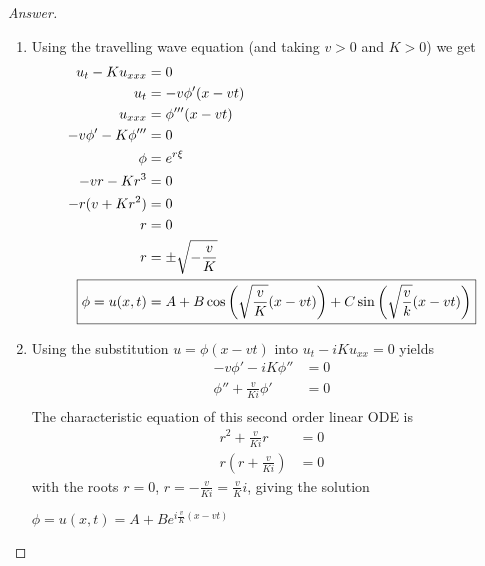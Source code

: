 \documentclass{article}
\theoremstyle{definition}
\renewcommand\qedsymbol{$\blacksquare$}
\newenvironment{ans}{\begin{proof}[Answer]\renewcommand{\qedsymbol}{}}{\end{proof}}
\begin{document}
\begin{ans}
\begin{enumerate}[start=38, resume*=answers]
    \item Using the travelling wave equation (and taking $v > 0$ and $K > 0$) we get\\
    \begin{align*}
        u_{t}-Ku_{xxx} &= 0\\
        u_{t} &= -v\phi'(x -vt)\\
        u_{xxx} &= \phi'''(x-vt)\\
        -v\phi' - K\phi''' &= 0\\
        \phi &= e^{r \xi}\\
        -vr-Kr^3 &= 0\\
        -r(v+Kr^2) &=0\\
        r &= 0\\
        r &= \pm \sqrt{-\frac{v}{K}}\\
        \Aboxed{\phi = u(x, t) &= A + B \cos\left(\sqrt{\frac{v}{K}}(x-vt)\right) + C \sin\left(\sqrt{\frac{v}{k}}(x-vt)\right)}
    \end{align*}


    \item Using the substitution $u = 
    \phi(x-vt)$ into $u_t-iKu_{xx}=0$ yields
    \begin{align*}
        -v\phi'-iK\phi'' &=0\\
        \phi'' + \frac{v}{Ki}\phi' &=0\\
    \end{align*}
    The characteristic equation of this second order linear ODE is
    \begin{align*}
          r^2+\frac{v}{Ki}r&=0\\
          r\left(r+\frac{v}{Ki}\right)&=0
    \end{align*}
    with the roots $r = 0$, $r = -\frac{v}{Ki} = \frac{v}{K}i$, giving the solution
    \begin{center}
    $\boxed{\phi=u(x,t)= A + Be^{i\frac{v}{K}(x-vt)}}$
    \end{center}


\end{enumerate}
\end{ans}
\end{document}
